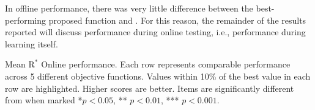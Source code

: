 In offline performance, there was very little difference between the best-performing proposed function and \tloA{}. For this reason, the remainder of the results reported will discuss performance during online testing, i.e., performance during learning itself.%


\begin{table}[t]
\footnotesize
  \caption{Mean $\text{R}^*$ Online performance. Each row represents comparable performance across 5 different objective functions. Values within 10\% of the best value in each row are highlighted. Higher scores are better. Items are significantly different from \tloA{} when marked *$p<0.05$, ** $p <0.01$, *** $p<0.001$.}
  \label{tab:mean_r_star_performance}
\begin{adjustbox}{width=\columnwidth}

\end{adjustbox}
\end{table}

 


